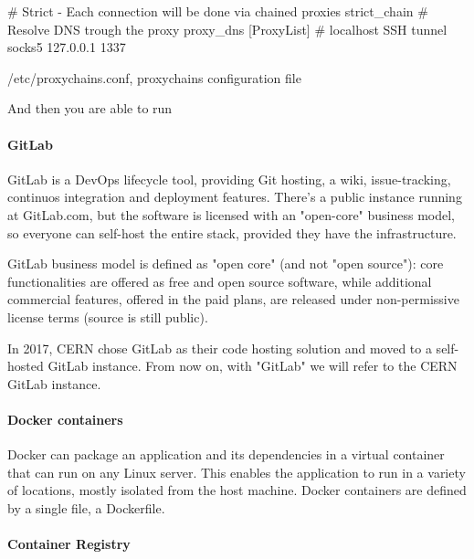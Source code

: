 \begin{listing}[ht]
\begin{textcode}
# Strict - Each connection will be done via chained proxies
strict_chain
# Resolve DNS trough the proxy
proxy_dns
[ProxyList]
# localhost SSH tunnel
socks5  127.0.0.1 1337
\end{textcode}
\caption{/etc/proxychains.conf, proxychains configuration file}
\end{listing}

And then you are able to run


\paragraph{GitLab}

GitLab is a DevOps lifecycle tool, providing Git hosting, a wiki, issue-tracking, continuos integration and deployment features. There's a public instance running at GitLab.com, but the software is licensed with an "open-core" business model, so everyone can self-host the entire stack, provided they have the infrastructure.

GitLab business model is defined as "open core" (and not "open source"): core functionalities are offered as free and open source software, while additional commercial features, offered in the paid plans, are released under non-permissive license terms (source is still public).

In 2017, CERN chose GitLab as their code hosting solution and moved to a self-hosted GitLab instance. From now on, with "GitLab" we will refer to the CERN GitLab instance.

\paragraph{Docker containers}

Docker can package an application and its dependencies in a virtual container that can run on any Linux server. This enables the application to run in a variety of locations, mostly isolated from the host machine. Docker containers are defined by a single file, a Dockerfile.

\paragraph{Container Registry}


